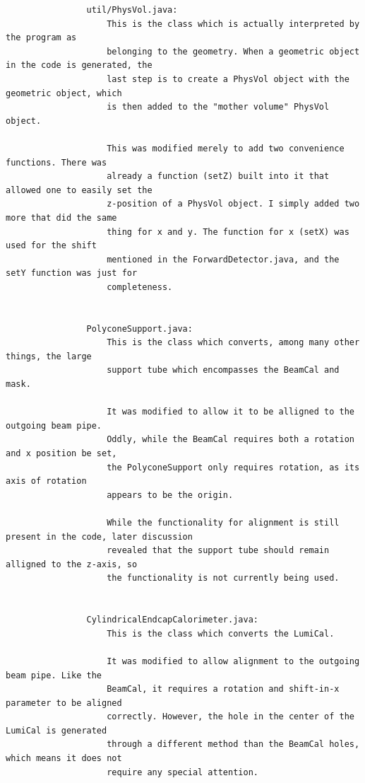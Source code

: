 \documentclass{report}
\begin{document}
\begin{verbatim}
                util/PhysVol.java:
                    This is the class which is actually interpreted by the program as
                    belonging to the geometry. When a geometric object in the code is generated, the
                    last step is to create a PhysVol object with the geometric object, which
                    is then added to the "mother volume" PhysVol object.

                    This was modified merely to add two convenience functions. There was
                    already a function (setZ) built into it that allowed one to easily set the
                    z-position of a PhysVol object. I simply added two more that did the same
                    thing for x and y. The function for x (setX) was used for the shift
                    mentioned in the ForwardDetector.java, and the setY function was just for
                    completeness.


                PolyconeSupport.java:
                    This is the class which converts, among many other things, the large
                    support tube which encompasses the BeamCal and mask.

                    It was modified to allow it to be alligned to the outgoing beam pipe.
                    Oddly, while the BeamCal requires both a rotation and x position be set,
                    the PolyconeSupport only requires rotation, as its axis of rotation
                    appears to be the origin.

                    While the functionality for alignment is still present in the code, later discussion
                    revealed that the support tube should remain alligned to the z-axis, so
                    the functionality is not currently being used.


                CylindricalEndcapCalorimeter.java:
                    This is the class which converts the LumiCal.

                    It was modified to allow alignment to the outgoing beam pipe. Like the
                    BeamCal, it requires a rotation and shift-in-x parameter to be aligned
                    correctly. However, the hole in the center of the LumiCal is generated
                    through a different method than the BeamCal holes, which means it does not
                    require any special attention.
            \end{verbatim}
\end{document}
